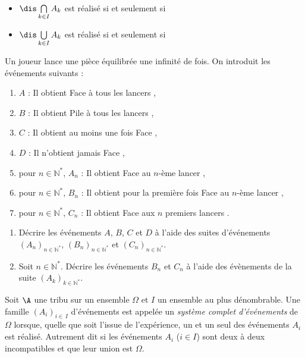 \documentclass[a4paper,10pt]{report}
\begin{document}
\vspace{0.2cm}

\begin{itemize}
  \item $\dis \bigcap\limits_{k\in I} A_k$ est réalisé si et seulement si 
  \item  $\dis \bigcup\limits_{k\in I} A_k$ est réalisé si et seulement si 
\end{itemize}

\medskip

\begin{ex} Un joueur lance  une pièce équilibrée une infinité de fois. On introduit les événements suivants :
\begin{enumerate}
\item[\tri] $A$ : \og Il obtient Face à tous les lancers \fg,
\item[\tri] $B$ : \og Il obtient Pile à tous les lancers \fg,
\item[\tri] $C$ : \og Il obtient au moins une fois Face \fg,
\item[\tri] $D$ : \og Il n'obtient jamais Face \fg,
\item[\tri] pour $n \in \mathbb{N}^*$, $A_n$ : \og Il obtient Face au $n$-ème lancer \fg,
\item[\tri] pour $n \in \mathbb{N}^*$, $B_n$ : \og Il obtient pour la première fois Face au $n$-ème lancer \fg,
\item[\tri] pour $n \in \mathbb{N}^*$, $C_n$ : \og Il obtient Face aux $n$ premiers lancers \fg.
\end{enumerate}
\begin{enumerate}
\item Décrire les événements $A$, $B$, $C$ et $D$ à l'aide des suites d'événements $(A_n)_{n \in \mathbb{N}^*}$, $(B_n)_{n \in \mathbb{N}^*}$ et $(C_n)_{n \in \mathbb{N}^*}$.

\vspace{3cm}
\item Soit $n \in \mathbb{N}^*$. Décrire les événements $B_n$ et $C_n$ à l'aide des évènements de la suite $(A_k)_{k \in \mathbb{N}^*}$.

\vspace{3cm}
\end{enumerate}
\end{ex}



\begin{defin}
Soit $\A$ une tribu sur un ensemble $\Omega$ et $I$ un ensemble au plus dénombrable.
Une famille $(A_i)_{i\in\, I}$ {d'événements} est appelée un \textit{système complet d'événements} de $\Omega$ lorsque, quelle que soit l'issue de l'expérience, un et un seul des événements $A_i$ est réalisé. Autrement dit si les événements $A_i$ ($i \in I$) sont deux à deux incompatibles et que leur union est $\Omega$.
\end{defin}
\end{document}
